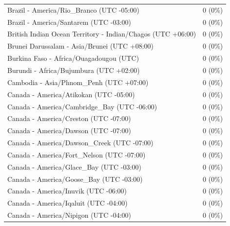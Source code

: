 \documentclass[
  english,
  man]{apa6}
\begin{document}
\begin{appendix}
\begin{table}
{\begin{tabular}[t]{ll}
\hspace{1em}Brazil - America/Rio\_Branco (UTC -05:00) & 0 (0\%)\\
\hspace{1em}Brazil - America/Santarem (UTC -03:00) & 0 (0\%)\\
\hspace{1em}British Indian Ocean Territory - Indian/Chagos (UTC +06:00) & 0 (0\%)\\
\hspace{1em}Brunei Darussalam - Asia/Brunei (UTC +08:00) & 0 (0\%)\\
\addlinespace
\hspace{1em}Burkina Faso - Africa/Ouagadougou (UTC) & 0 (0\%)\\
\hspace{1em}Burundi - Africa/Bujumbura (UTC +02:00) & 0 (0\%)\\
\hspace{1em}Cambodia - Asia/Phnom\_Penh (UTC +07:00) & 0 (0\%)\\
\hspace{1em}Canada - America/Atikokan (UTC -05:00) & 0 (0\%)\\
\hspace{1em}Canada - America/Cambridge\_Bay (UTC -06:00) & 0 (0\%)\\
\addlinespace
\hspace{1em}Canada - America/Creston (UTC -07:00) & 0 (0\%)\\
\hspace{1em}Canada - America/Dawson (UTC -07:00) & 0 (0\%)\\
\hspace{1em}Canada - America/Dawson\_Creek (UTC -07:00) & 0 (0\%)\\
\hspace{1em}Canada - America/Fort\_Nelson (UTC -07:00) & 0 (0\%)\\
\hspace{1em}Canada - America/Glace\_Bay (UTC -03:00) & 0 (0\%)\\
\addlinespace
\hspace{1em}Canada - America/Goose\_Bay (UTC -03:00) & 0 (0\%)\\
\hspace{1em}Canada - America/Inuvik (UTC -06:00) & 0 (0\%)\\
\hspace{1em}Canada - America/Iqaluit (UTC -04:00) & 0 (0\%)\\
\hspace{1em}Canada - America/Nipigon (UTC -04:00) & 0 (0\%)\\

\end{tabular}}
\end{table}
\end{appendix}
\end{document}
